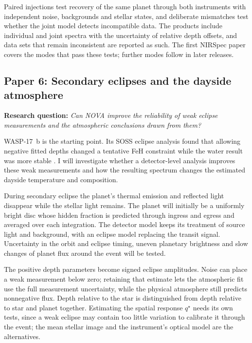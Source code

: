 Paired injections test recovery of the same planet through both
instruments with independent noise, backgrounds and stellar states, and
deliberate mismatches test whether the joint model detects incompatible
data. The products include individual and joint spectra with the
uncertainty of relative depth offsets, and data sets that remain
inconsistent are reported as such. The first NIRSpec paper covers the
modes that pass these tests; further modes follow in later releases.

\subsection{Paper 6: Secondary eclipses and the dayside atmosphere}
\label{subsec:fw_eclipses}

\noindent\textbf{Research question:} \textit{Can NOVA improve the
reliability of weak eclipse measurements and the atmospheric conclusions
drawn from them?}

WASP-17~b is the starting point. Its SOSS eclipse analysis found that
allowing negative fitted depths changed a tentative FeH constraint while
the water result was more stable \citep{GressierEtAl2024}. I will
investigate whether a detector-level analysis improves these weak
measurements and how the resulting spectrum changes the estimated dayside
temperature and composition.

During secondary eclipse the planet's thermal emission and reflected light
disappear while the stellar light remains. The planet will initially be a
uniformly bright disc whose hidden fraction is predicted through ingress
and egress and averaged over each integration. The detector model keeps
its treatment of source light and background, with an eclipse model
replacing the transit signal. Uncertainty in the orbit and eclipse timing,
uneven planetary brightness and slow changes of planet flux around the
event will be tested.

The positive depth parameters become signed eclipse amplitudes. Noise can
place a weak measurement below zero; retaining that estimate lets the
atmospheric fit use the full measurement uncertainty, while the physical
atmosphere still predicts nonnegative flux. Depth relative to the star is
distinguished from depth relative to star and planet together. Estimating
the spatial response $q^\star$ needs its own tests, since a weak eclipse
may contain too little variation to calibrate it through the event; the
mean stellar image and the instrument's optical model are the
alternatives.

